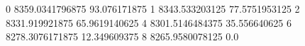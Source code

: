 0 8359.0341796875 93.076171875
1 8343.533203125 77.5751953125
2 8331.919921875 65.9619140625
4 8301.5146484375 35.556640625
6 8278.3076171875 12.349609375
8 8265.9580078125 0.0
